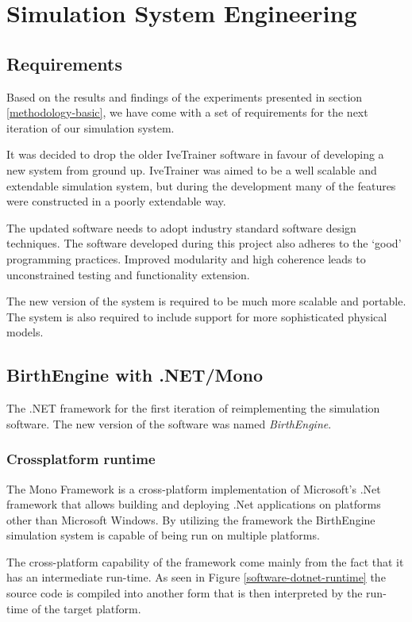 \section{Simulation System Engineering}\label{methodology-software}

\subsection{Requirements}

Based on the results and findings of the experiments presented in section \ref{methodology-basic}, we have come with a set of requirements for the next iteration of our simulation system.

It was decided to drop the older IveTrainer software in favour of developing a new system from ground up. IveTrainer was aimed to be a well scalable and extendable simulation system, but during the development many of the features were constructed in a poorly extendable way.

The updated software needs to adopt industry standard software design techniques. The software developed during this project also adheres to the `good' programming practices. Improved modularity and high coherence leads to unconstrained testing and functionality extension.

The new version of the system is required to be much more scalable and portable. The system is also required to include support for more sophisticated physical models.

\subsection{BirthEngine with .NET/Mono}

The .NET framework for the first iteration of reimplementing the simulation software. The new version of the software was named \textit{BirthEngine}.

\subsubsection{Crossplatform runtime}
  The Mono Framework \citep{mono_framework} is a cross-platform implementation of Microsoft's .Net framework that allows building and deploying .Net applications on platforms other than Microsoft Windows. By utilizing the framework the BirthEngine simulation system is capable of being run on multiple platforms.

The cross-platform capability of the framework come mainly from the fact that it has an intermediate run-time. As seen in Figure \ref{software-dotnet-runtime} the source code is compiled into another form that is then interpreted by the run-time of the target platform.

